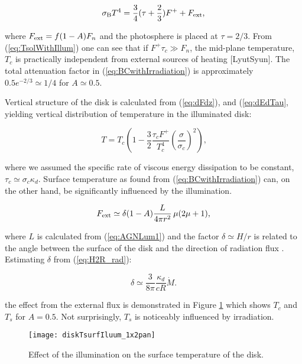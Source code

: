 \documentclass[12pt,english,preprint]{aastex}
\begin{document}
\begin{equation}
\sigma_{{\rm B}}T^{4}=\frac{3}{4}(\tau+\frac{2}{3})F^{+}+F_{{\rm ext}}\mbox{,}\label{eq:TsolWithIllum}
\end{equation}

\noindent where $F_{{\rm ext}}=f(1-A)F_{n}$ and the photosphere is placed at
$\tau=2/3$. From (\ref{eq:TsolWithIllum}) one can see that if $F^{+}\tau_{c}\gg F_{n}$,
the mid-plane temperature, $T_{c}$ is practically independent from
external sources of heating {[}LyutSyun{]}. The total attenuation
factor in (\ref{eq:BCwithIrradiation}) is approximately $0.5e^{-2/3}\simeq1/4$
for $A\simeq0.5$.

Vertical structure of the disk is calculated from (\ref{eq:dFdz}), and
(\eqref{eq:dEdTau}, yielding vertical distribution of temperature
in the illuminated disk:

\begin{equation}
T=T_{c}\left(1-\frac{3}{2}\frac{\tau_{c}F^{+}}{T_{c}^{4}}\left(\frac{\sigma}{\sigma_{c}}\right)^{2}\right)\mbox{,}\label{eq:TcWithIllum}
\end{equation}

\noindent where we assumed the specific rate of viscous energy dissipation to
be constant, $\tau_{c}\simeq\sigma_{c}\kappa_{d}$. Surface temperature
as found from (\ref{eq:BCwithIrradiation}) can, on the other hand,
be significantly influenced by the illumination.

\begin{equation}
F_{{\rm ext}}\simeq\delta(1-A)\frac{L}{4\pi r^{2}}\,\mu(2\mu+1)\mbox{,}\label{eq:FextFormula}
\end{equation}

\noindent where $L$ is calculated from (\ref{eq:AGNLum1}) and the factor $\delta\simeq H/r$
is related to the angle between the surface of the disk and the direction
of radiation flux \citep{meyerVerticalStructureAccretion1982,Spruit96}.
Estimating $\delta$ from (\ref{eq:H2R_rad}):

\begin{equation}
\delta\simeq\frac{3}{8\pi}\frac{\kappa_{d}}{cR}\dot{M}\mbox{.}\label{eq:delt_illum}
\end{equation}

\noindent the effect from the external flux is demonstrated in Figure \ref{Fig:TcWithExtIrrad}
which shows $T_{c}$ and $T_{s}$ for $A=0.5$. Not surprisingly, $T_{s}$
is noticeably influenced by irradiation. 

\begin{figure}
\texttt{[image: diskTsurfIluum\_1x2pan]}\caption{Effect of the illumination on the surface temperature of the disk.}
\label{Fig:TcWithExtIrrad} 
\end{figure}
\end{document}

